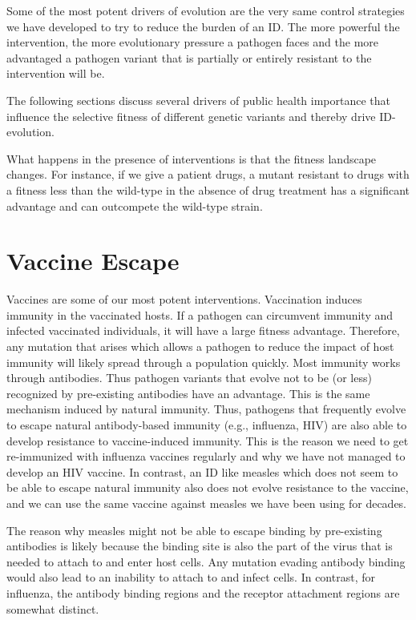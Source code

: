 \documentclass[]{book}
\theoremstyle{definition}
\theoremstyle{definition}
\theoremstyle{definition}
\theoremstyle{remark}
\begin{document}
Some of the most potent drivers of evolution are the very same control
strategies we have developed to try to reduce the burden of an ID. The
more powerful the intervention, the more evolutionary pressure a
pathogen faces and the more advantaged a pathogen variant that is
partially or entirely resistant to the intervention will be.

The following sections discuss several drivers of public health
importance that influence the selective fitness of different genetic
variants and thereby drive ID-evolution.

What happens in the presence of interventions is that the fitness
landscape changes. For instance, if we give a patient drugs, a mutant
resistant to drugs with a fitness less than the wild-type in the absence
of drug treatment has a significant advantage and can outcompete the
wild-type strain.

\hypertarget{vaccine-escape}{%
\section{Vaccine Escape}\label{vaccine-escape}}

Vaccines are some of our most potent interventions. Vaccination induces
immunity in the vaccinated hosts. If a pathogen can circumvent immunity
and infected vaccinated individuals, it will have a large fitness
advantage. Therefore, any mutation that arises which allows a pathogen
to reduce the impact of host immunity will likely spread through a
population quickly. Most immunity works through antibodies. Thus
pathogen variants that evolve not to be (or less) recognized by
pre-existing antibodies have an advantage. This is the same mechanism
induced by natural immunity. Thus, pathogens that frequently evolve to
escape natural antibody-based immunity (e.g., influenza, HIV) are also
able to develop resistance to vaccine-induced immunity. This is the
reason we need to get re-immunized with influenza vaccines regularly and
why we have not managed to develop an HIV vaccine. In contrast, an ID
like measles which does not seem to be able to escape natural immunity
also does not evolve resistance to the vaccine, and we can use the same
vaccine against measles we have been using for decades.

The reason why measles might not be able to escape binding by
pre-existing antibodies is likely because the binding site is also the
part of the virus that is needed to attach to and enter host cells. Any
mutation evading antibody binding would also lead to an inability to
attach to and infect cells. In contrast, for influenza, the antibody
binding regions and the receptor attachment regions are somewhat
distinct.
\end{document}
